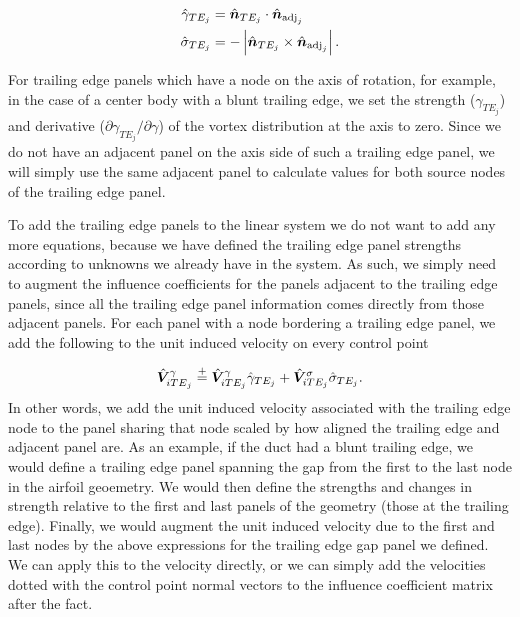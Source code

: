 \begin{align}
        \hat{\gamma}_{TE_j} &= \hat{\bm{n}}_{TE_j} \cdot \hat{\bm{n}}_{\text{adj}_j} \\
        \hat{\sigma}_{TE_j} &= -\left|\hat{\bm{n}}_{TE_j} \times \hat{\bm{n}}_{\text{adj}_j}\right|.
\end{align}

For trailing edge panels which have a node on the axis of rotation, for example, in the case of a center body with a blunt trailing edge, we set the strength (\(\gamma_{TE_j}\)) and derivative (\(\partial \gamma_{TE_j}/\partial \gamma\)) of the vortex distribution at the axis to zero.
%
Since we do not have an adjacent panel on the axis side of such a trailing edge panel, we will simply use the same adjacent panel to calculate values for both source nodes of the trailing edge panel.

To add the trailing edge panels to the linear system we do not want to add any more equations, because we have defined the trailing edge panel strengths according to unknowns we already have in the system.
%
As such, we simply need to augment the influence coefficients for the panels adjacent to the trailing edge panels, since all the trailing edge panel information comes directly from those adjacent panels.
%
For each panel with a node bordering a trailing edge panel, we add the following to the unit induced velocity on every control point

\begin{equation}
    \hat{\bm{V}}^\gamma_{i{TE}_j} \stackrel{+}{=} \hat{\bm{V}}^\gamma_{iTE_j}\hat{\gamma}_{TE_j} + \hat{\bm{V}}^\sigma_{iTE_j}\hat{\sigma}_{TE_j}.
\end{equation}
%
In other words, we add the unit induced velocity associated with the trailing edge node to the panel sharing that node scaled by how aligned the trailing edge and adjacent panel are.
%
As an example, if the duct had a blunt trailing edge, we would define a trailing edge panel spanning the gap from the first to the last node in the airfoil geoemetry.
%
We would then define the strengths and changes in strength relative to the first and last panels of the geometry (those at the trailing edge).
%
Finally, we would augment the unit induced velocity due to the first and last nodes by the above expressions for the trailing edge gap panel we defined.
%
We can apply this to the velocity directly, or we can simply add the velocities dotted with the control point normal vectors to the influence coefficient matrix after the fact.

